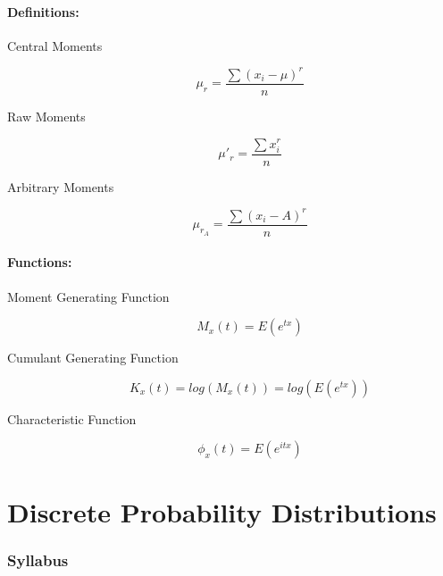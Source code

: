 \documentclass[
10pt, %
a4paper, %
]{report}
\begin{document}
\subsection{Definitions:}
\begin{description}
  \item[Central Moments]
    \[
    \mu_r = \frac{\sum(x_i-\mu)^r}{n}
    \]
  \item[Raw Moments]
    \[
    \mu'_r = \frac{\sum x_i^r}{n}
    \]
  \item[Arbitrary Moments]
    \[
    \mu_{r_A} = \frac{\sum(x_i-A)^r}{n}
    \]
    
\end{description}

\subsection{Functions:}
\begin{description}
  \item[Moment Generating Function]
    \[
    M_x(t) = E(e^{tx})
    \]
  \item[Cumulant Generating Function]
    \[
    K_x(t) = log(M_x(t)) = log(E(e^{tx}))
    \]
  \item[Characteristic Function ]
    \[
    \phi_x(t) = E(e^{itx})
    \]
    
\end{description}

\part{Discrete Probability Distributions}
\section*{Syllabus}
\end{document}
